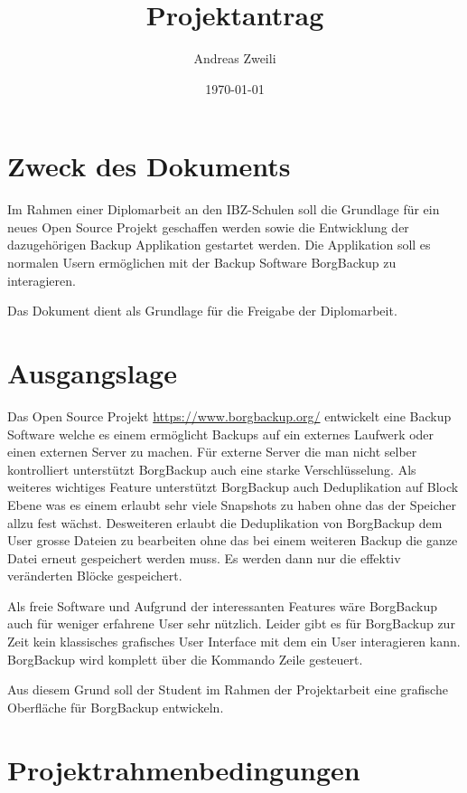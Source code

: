 \documentclass[a4paper,11pt]{article}
\author{Andreas Zweili}
\date{\today}
\title{Projektantrag}
\begin{document}
\maketitle\newpage
\tableofcontents
\newpage

\section{Zweck des Dokuments}
\label{sec:orgab10096}
Im Rahmen einer Diplomarbeit an den IBZ-Schulen soll die Grundlage für
ein neues Open Source Projekt geschaffen werden sowie die Entwicklung
der dazugehörigen Backup Applikation gestartet werden. Die Applikation
soll es normalen Usern ermöglichen mit der Backup Software BorgBackup
zu interagieren.

Das Dokument dient als Grundlage für die Freigabe der Diplomarbeit.

\section{Ausgangslage}
\label{sec:org0593429}
Das Open Source Projekt \url{https://www.borgbackup.org/} entwickelt eine
Backup Software welche es einem ermöglicht Backups auf ein externes
Laufwerk oder einen externen Server zu machen. Für externe Server die
man nicht selber kontrolliert unterstützt BorgBackup auch eine starke
Verschlüsselung. Als weiteres wichtiges Feature unterstützt BorgBackup
auch Deduplikation auf Block Ebene was es einem erlaubt sehr viele
Snapshots zu haben ohne das der Speicher allzu fest wächst.
Desweiteren erlaubt die Deduplikation von BorgBackup dem User grosse
Dateien zu bearbeiten ohne das bei einem weiteren Backup die ganze
Datei erneut gespeichert werden muss. Es werden dann nur die effektiv
veränderten Blöcke gespeichert.

Als freie Software und Aufgrund der interessanten Features wäre
BorgBackup auch für weniger erfahrene User sehr nützlich. Leider gibt
es für BorgBackup zur Zeit kein klassisches grafisches User Interface
mit dem ein User interagieren kann. BorgBackup wird komplett über die
Kommando Zeile gesteuert.

Aus diesem Grund soll der Student im Rahmen der Projektarbeit eine
grafische Oberfläche für BorgBackup entwickeln.

\section{Projektrahmenbedingungen}
\label{sec:org9c4e3fa}
\end{document}

